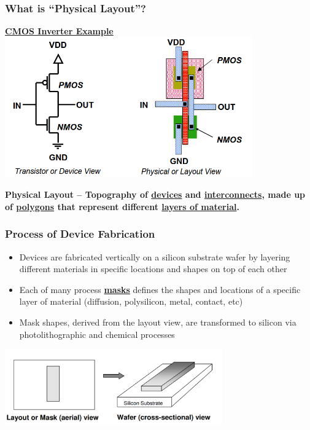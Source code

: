\documentclass[compress]{beamer}
\begin{document}
\begin{frame}
	\frametitle{What is “Physical Layout”?}
		\begin{center}
			\textbf{\underline{CMOS Inverter Example}}
			\includegraphics[width=0.8\textwidth]{CMOS}
	\end{center}
\textbf{Physical Layout – Topography of \underline{devices} and \underline{interconnects}, made
	up of \underline{polygons} that represent different \underline{layers of material}.	}
\end{frame}

\begin{frame}
	\frametitle{Process of Device Fabrication}
	\begin{itemize}
		\item Devices are fabricated vertically on a silicon substrate wafer by
		layering different materials in specific locations and shapes on
		top of each other
		\item Each of many process \textbf{\underline{masks}} defines the shapes and locations
		of a specific layer of material (diffusion, polysilicon, metal,
		contact, etc)
		\item Mask shapes, derived from the layout view, are transformed to
		silicon via photolithographic and chemical processes
	\end{itemize}
\begin{center}
	\includegraphics[width=0.7\textwidth]{wafer}
\end{center}
\end{frame}
\end{document}
